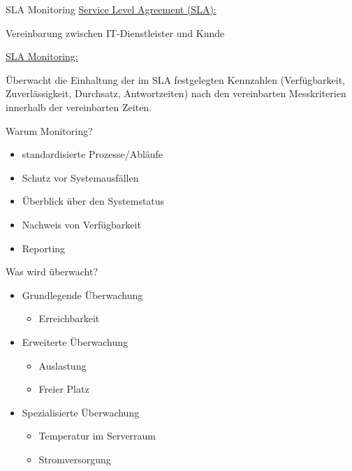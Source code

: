 \documentclass[12pt]{beamer}              %
\begin{document}
\begin{frame}{SLA Monitoring}
	\underline{Service Level Agreement (SLA):}\medskip
	
	Vereinbarung zwischen IT-Dienstleister und Kunde\bigskip
	
	\underline{SLA Monitoring:}\medskip
	
	Überwacht die Einhaltung der im SLA festgelegten Kennzahlen (Verfügbarkeit, Zuverlässigkeit, Durchsatz, Antwortzeiten) nach den vereinbarten Messkriterien innerhalb der vereinbarten Zeiten.
\end{frame}
\begin{frame}{Warum Monitoring?}
	\begin{itemize}
		\item standardisierte Prozesse/Abläufe
		\item Schutz vor Systemausfällen
		\item Überblick über den Systemstatus
		\item Nachweis von Verfügbarkeit
		\item Reporting
	\end{itemize}
\end{frame}
\begin{frame}{Was wird überwacht?}
	\begin{center}
		\begin{itemize}
			\item Grundlegende Überwachung
			\begin{itemize}
				\item Erreichbarkeit
			\end{itemize}
			\item Erweiterte Überwachung
			\begin{itemize}
				\item Auslastung
				\item Freier Platz
			\end{itemize}
			\item Spezialisierte Überwachung
			\begin{itemize}
				\item Temperatur im Serverraum
				\item Stromversorgung
			\end{itemize}
		\end{itemize}
	\end{center}
	
	
\end{frame}
\end{document}
